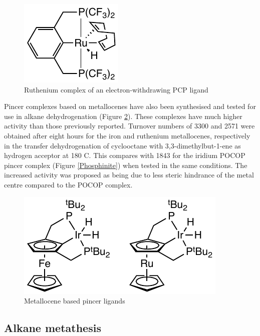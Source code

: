 \begin{figure}[ht]
\centering
\includegraphics[]{../Figures/ElectronwithdrawingPCP.pdf}
\caption[Ruthenium complex of an electron-withdrawing PCP ligand]{Ruthenium complex of an electron-withdrawing PCP ligand}
\label{ElectronwithdrawingPCP}
\end{figure}

Pincer complexes based on metallocenes have also been synthesised and tested for use in alkane dehydrogenation (Figure \ref{Metallocenepincers}).\cite{Kuklin2006}  These complexes have much higher activity than those previously reported.  Turnover numbers of 3300 and 2571 were obtained after eight hours for the iron and ruthenium metallocenes, respectively in the transfer dehydrogenation of cyclooctane with 3,3-dimethylbut-1-ene as hydrogen acceptor at 180 \degrees C.  This compares with 1843 for the iridium POCOP pincer complex (Figure \ref{Phosphinite}) when tested in the same conditions.  The increased activity was proposed as being due to less steric hindrance of the metal centre compared to the POCOP complex.\cite{Kuklin2006}

\begin{figure}[ht]
\centering
\includegraphics[]{../Figures/Metallocenepincers.pdf}
\caption[Metallocene based pincer ligands]{Metallocene based pincer ligands}
\label{Metallocenepincers}
\end{figure}

\subsection{Alkane metathesis}

